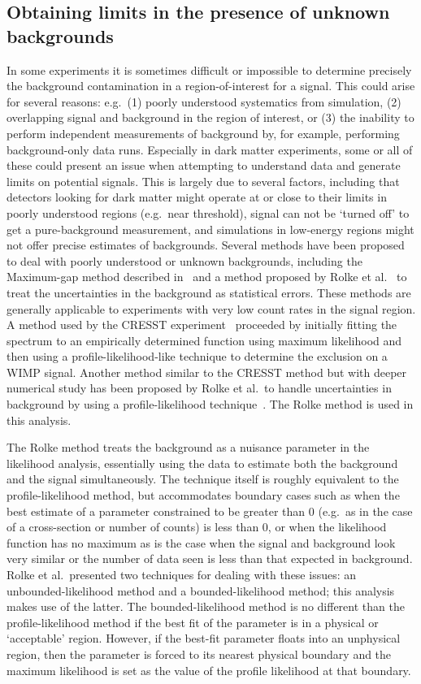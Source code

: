 	\subsection{Obtaining limits in the presence of unknown backgrounds}
	\label{sec:LimitsUnknownBackgroundML}	
	
In some experiments it is sometimes difficult or impossible to determine precisely the background contamination in a region-of-interest for a signal.  This could arise for several reasons: e.g.~(1) poorly understood systematics from simulation, (2) overlapping signal and background in the region of interest, or (3) the inability to perform independent measurements of background by, for example, performing background-only data runs.  Especially in dark matter experiments, some or all of these could present an issue when attempting to understand data and generate limits on potential signals.  This is largely due to several factors, including that detectors looking for dark matter might operate at or close to their limits in poorly understood regions (e.g.~near threshold), signal can not be `turned off' to get a pure-background measurement, and simulations in low-energy regions might not offer precise estimates of backgrounds.  Several methods have been proposed to deal with poorly understood or unknown backgrounds, including the Maximum-gap method described in~\cite{Yell02} and a method proposed by Rolke et al.~\cite{Rolke2001} to treat the uncertainties in the background as statistical errors.  These methods are generally applicable to experiments with very low count rates in the signal region.  A method used by the CRESST experiment~\cite{Anglo2002} proceeded by initially fitting the spectrum to an empirically determined function using maximum likelihood and then using a profile-likelihood-like technique to determine the exclusion on a WIMP signal.  Another method similar to the CRESST method but with deeper numerical study has been proposed by Rolke et al.~to handle uncertainties in background by using a profile-likelihood technique~\cite{Rol05}.  The Rolke method is used in this analysis.  

The Rolke method treats the background as a nuisance parameter in the likelihood analysis, essentially using the data to estimate both the background and the signal simultaneously.  The technique itself is roughly equivalent to the profile-likelihood method, but accommodates boundary cases such as when the best estimate of a parameter constrained to be greater than 0 (e.g.~as in the case of a cross-section or number of counts) is less than 0, or when the likelihood function has no maximum as is the case when the signal and background look very similar or the number of data seen is less than that expected in background.  Rolke et al.~presented two techniques for dealing with these issues: an unbounded-likelihood method and a bounded-likelihood method; this analysis makes use of the latter.  The bounded-likelihood method is no different than the profile-likelihood method if the best fit of the parameter is in a physical or `acceptable' region.  However, if the best-fit parameter floats into an unphysical region, then the parameter is forced to its nearest physical boundary and the maximum likelihood is set as the value of the profile likelihood at that boundary.  

